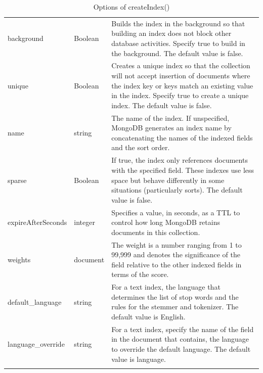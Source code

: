 \documentclass[12pt]{article}
\begin{document}
\begin{bashcode}
\begin{bashcode}
\begin{table}[H]
\centering
\begin{threeparttable}
  \begin{tabular}{llp{22em}}
  \toprule
  \thead{\bfseries Parameter} & \thead{\bfseries Type} & \thead{\bfseries Description} \\
  \midrule
background  & Boolean & Builds the index in the background so that building an index does not block other database activities. Specify true to build in the background. The default value is false. \\
unique &  Boolean & Creates a unique index so that the collection will not accept insertion of documents where the index key or keys match an existing value in the index. Specify true to create a unique index. The default value is false. \\
name &    string &  The name of the index. If unspecified, MongoDB generates an index name by concatenating the names of the indexed fields and the sort order. \\
sparse &  Boolean & If true, the index only references documents with the specified field. These indexes use less space but behave differently in some situations (particularly sorts). The default value is false. \\
expireAfterSeconds &  integer & Specifies a value, in seconds, as a TTL to control how long MongoDB retains documents in this collection. \\
weights & document    & The weight is a number ranging from 1 to 99,999 and denotes the significance of the field relative to the other indexed fields in terms of the score. \\
default\_language  & string &For a text index, the language that determines the list of stop words and the rules for the stemmer and tokenizer. The default value is English.\\
language\_override & string &For a text index, specify the name of the field in the document that contains, the language to override the default language. The default value is language. \\
  \bottomrule\addlinespace[1ex]
\end{tabular}
\end{threeparttable}
  \caption{Options of createIndex()}
  \label{tab:create-index-options}
\end{table}



\end{bashcode}
\end{bashcode}
\end{document}
